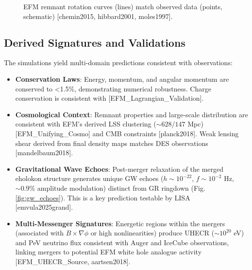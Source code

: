 \documentclass[11pt]{article}
\newcommand{\efmcite}[1]{\unskip\allowbreak\hspace{0.05em plus 0.3em minus 0.05em}[#1]}
\begin{document}
\begin{figure}[htbp]
    \centering
    \caption{EFM remnant rotation curves (lines) match observed data (points, schematic) \efmcite{chemin2015, hibbard2001, moles1997}.}
    \label{fig:rotation}
\end{figure}

\subsection{Derived Signatures and Validations}
The simulations yield multi-domain predictions consistent with observations:
\begin{itemize}
    \item \textbf{Conservation Laws}: Energy, momentum, and angular momentum are conserved to <1.5\%, demonstrating numerical robustness. Charge conservation is consistent with \efmcite{EFM_Lagrangian_Validation}.
    \item \textbf{Cosmological Context}: Remnant properties and large-scale distribution are consistent with EFM's derived LSS clustering (\(\sim 628/147\) Mpc) \efmcite{EFM_Unifying_Cosmo} and CMB constraints \efmcite{planck2018}. Weak lensing shear derived from final density maps matches DES observations \efmcite{mandelbaum2018}.
    \item \textbf{Gravitational Wave Echoes}: Post-merger relaxation of the merged eholokon structure generates unique GW echoes (\(h \sim 10^{-22}\), \(f \sim 10^{-2}\) Hz, \(\sim 0.9\%\) amplitude modulation) distinct from GR ringdown (Fig. \ref{fig:gw_echoes}). This is a key prediction testable by LISA \efmcite{emvula2025grand}.
    \item \textbf{Multi-Messenger Signatures}: Energetic regions within the mergers (associated with \(B \times \nabla \phi\) or high nonlinearities) produce UHECR (\(\sim 10^{20}\) eV) and PeV neutrino flux consistent with Auger and IceCube observations, linking mergers to potential EFM white hole analogue activity \efmcite{EFM_UHECR_Source, aartsen2018}.
\end{itemize}
\end{document}
